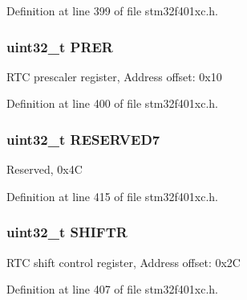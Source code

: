 Definition at line 399 of file stm32f401xc.\+h.

\subsubsection[{\texorpdfstring{P\+R\+ER}{PRER}}]{ uint32\+\_\+t P\+R\+ER}\hypertarget{struct_r_t_c___type_def_ac9b4c6c5b29f3461ce3f875eea69f35b}{}\label{struct_r_t_c___type_def_ac9b4c6c5b29f3461ce3f875eea69f35b}
R\+TC prescaler register, Address offset\+: 0x10 

Definition at line 400 of file stm32f401xc.\+h.

\subsubsection[{\texorpdfstring{R\+E\+S\+E\+R\+V\+E\+D7}{RESERVED7}}]{\setlength{\rightskip}{0pt plus 5cm}uint32\+\_\+t R\+E\+S\+E\+R\+V\+E\+D7}\hypertarget{struct_r_t_c___type_def_a6be3d40baea405ecaf6b38462357dac0}{}\label{struct_r_t_c___type_def_a6be3d40baea405ecaf6b38462357dac0}
Reserved, 0x4C 

Definition at line 415 of file stm32f401xc.\+h.

\subsubsection[{\texorpdfstring{S\+H\+I\+F\+TR}{SHIFTR}}]{ uint32\+\_\+t S\+H\+I\+F\+TR}\hypertarget{struct_r_t_c___type_def_a2372c05a6c5508e0a9adada793f68b4f}{}\label{struct_r_t_c___type_def_a2372c05a6c5508e0a9adada793f68b4f}
R\+TC shift control register, Address offset\+: 0x2C 

Definition at line 407 of file stm32f401xc.\+h.

